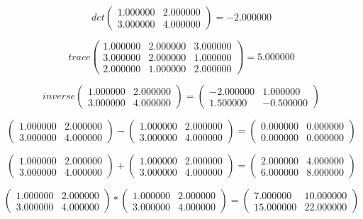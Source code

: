 \documentclass{article}
\begin{document}
$$det\begin{pmatrix}
1.000000 & 2.000000 \\
3.000000 & 4.000000
\end{pmatrix} = -2.000000$$

$$trace\begin{pmatrix}
1.000000 & 2.000000 & 3.000000 \\
3.000000 & 2.000000 & 1.000000 \\
2.000000 & 1.000000 & 2.000000
\end{pmatrix} = 5.000000$$

$$inverse\begin{pmatrix}
1.000000 & 2.000000 \\
3.000000 & 4.000000
\end{pmatrix} = \begin{pmatrix}
-2.000000 & 1.000000 \\
1.500000 & -0.500000
\end{pmatrix}$$

$$\begin{pmatrix}
1.000000 & 2.000000 \\
3.000000 & 4.000000
\end{pmatrix} - \begin{pmatrix}
1.000000 & 2.000000 \\
3.000000 & 4.000000
\end{pmatrix} = \begin{pmatrix}
0.000000 & 0.000000 \\
0.000000 & 0.000000
\end{pmatrix}$$

$$\begin{pmatrix}
1.000000 & 2.000000 \\
3.000000 & 4.000000
\end{pmatrix} + \begin{pmatrix}
1.000000 & 2.000000 \\
3.000000 & 4.000000
\end{pmatrix} = \begin{pmatrix}
2.000000 & 4.000000 \\
6.000000 & 8.000000
\end{pmatrix}$$

$$\begin{pmatrix}
1.000000 & 2.000000 \\
3.000000 & 4.000000
\end{pmatrix} * \begin{pmatrix}
1.000000 & 2.000000 \\
3.000000 & 4.000000
\end{pmatrix} = \begin{pmatrix}
7.000000 & 10.000000 \\
15.000000 & 22.000000
\end{pmatrix}$$
\end{document}
